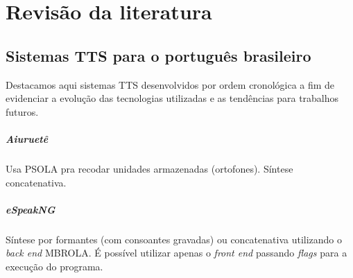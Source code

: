 

\chapter{Revisão da literatura}


\section{Sistemas TTS para o português brasileiro}
Destacamos aqui sistemas TTS desenvolvidos por ordem cronológica a fim de
evidenciar a evolução das tecnologias utilizadas e as tendências para trabalhos futuros.
\paragraph{Aiuruetê \cite{aiuruete}}
Usa PSOLA pra recodar unidades armazenadas (ortofones). Síntese concatenativa.
\paragraph{eSpeakNG \cite{espeakng}}
Síntese por formantes (com consoantes gravadas) ou concatenativa utilizando o
\emph{back end} MBROLA. É possível utilizar apenas o \emph{front end} passando
\emph{flags} para a execução do programa.
